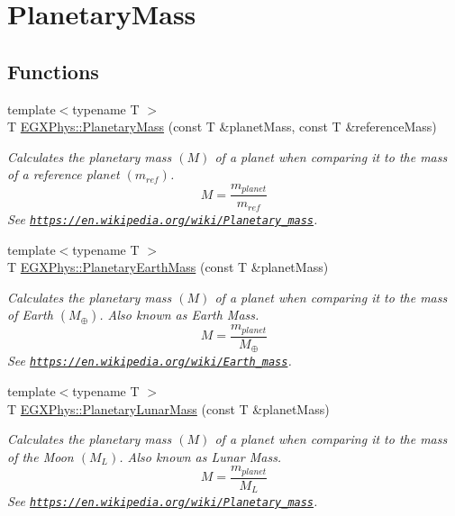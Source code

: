 \hypertarget{group___planetary_mass}{}\section{Planetary\+Mass}
\label{group___planetary_mass}
\subsection*{Functions}
\begin{DoxyCompactItemize}
\item 
{\footnotesize template$<$typename T $>$ }\\T \mbox{\hyperlink{group___planetary_mass_ga225bcf56fb37468f6d4d46493d403503}{E\+G\+X\+Phys\+::\+Planetary\+Mass}} (const T \&planet\+Mass, const T \&reference\+Mass)
\begin{DoxyCompactList}\small\item\em Calculates the planetary mass $(M)$ of a planet when comparing it to the mass of a reference planet $(m_{ref})$. \[M=\frac{m_{planet}}{m_{ref}}\] See \href{https://en.wikipedia.org/wiki/Planetary_mass}{\tt https\+://en.\+wikipedia.\+org/wiki/\+Planetary\+\_\+mass}. \end{DoxyCompactList}\item 
{\footnotesize template$<$typename T $>$ }\\T \mbox{\hyperlink{group___planetary_mass_ga3d918c2d37a72b42b49aa6c3da08f450}{E\+G\+X\+Phys\+::\+Planetary\+Earth\+Mass}} (const T \&planet\+Mass)
\begin{DoxyCompactList}\small\item\em Calculates the planetary mass $(M)$ of a planet when comparing it to the mass of Earth $(M_\oplus)$. Also known as Earth Mass. \[M=\frac{m_{planet}}{M_\oplus}\] See \href{https://en.wikipedia.org/wiki/Earth_mass}{\tt https\+://en.\+wikipedia.\+org/wiki/\+Earth\+\_\+mass}. \end{DoxyCompactList}\item 
{\footnotesize template$<$typename T $>$ }\\T \mbox{\hyperlink{group___planetary_mass_gaaea9675ef409d141d269d970f2f5e9dd}{E\+G\+X\+Phys\+::\+Planetary\+Lunar\+Mass}} (const T \&planet\+Mass)
\begin{DoxyCompactList}\small\item\em Calculates the planetary mass $(M)$ of a planet when comparing it to the mass of the Moon $(M_L)$. Also known as Lunar Mass. \[M=\frac{m_{planet}}{M_L}\] See \href{https://en.wikipedia.org/wiki/Planetary_mass}{\tt https\+://en.\+wikipedia.\+org/wiki/\+Planetary\+\_\+mass}. \end{DoxyCompactList}\item 

\end{DoxyCompactItemize}
